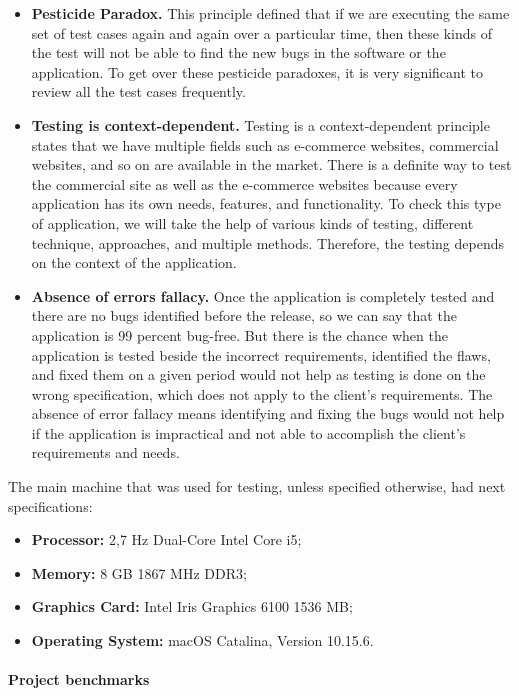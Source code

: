 \documentclass[thesis=M,english,hidelinks]{FITthesis}[2019/12/23]
\begin{document}
\begin{itemize}
	\item \textbf{Pesticide Paradox.} This principle defined that if we are executing the same set of test cases again and again over a particular time, then these kinds of the test will not be able to find the new bugs in the software or the application. To get over these pesticide paradoxes, it is very significant to review all the test cases frequently.
	\item \textbf{Testing is context-dependent.} Testing is a context-dependent principle states that we have multiple fields such as e-commerce websites, commercial websites, and so on are available in the market. There is a definite way to test the commercial site as well as the e-commerce websites because every application has its own needs, features, and functionality. To check this type of application, we will take the help of various kinds of testing, different technique, approaches, and multiple methods. Therefore, the testing depends on the context of the application.
	\item \textbf{Absence of errors fallacy.} Once the application is completely tested and there are no bugs identified before the release, so we can say that the application is 99 percent bug-free. But there is the chance when the application is tested beside the incorrect requirements, identified the flaws, and fixed them on a given period would not help as testing is done on the wrong specification, which does not apply to the client's requirements. The absence of error fallacy means identifying and fixing the bugs would not help if the application is impractical and not able to accomplish the client's requirements and needs.
\end{itemize}


The main machine that was used for testing, unless specified otherwise, had next specifications:
\begin{itemize}
	\item \textbf{Processor:} 2,7 Hz Dual-Core Intel Core i5;
	\item \textbf{Memory:} 8 GB 1867 MHz DDR3;
	\item \textbf{Graphics Card:} Intel Iris Graphics 6100 1536 MB;
	\item \textbf{Operating System:} macOS Catalina, Version 10.15.6.
\end{itemize}

\paragraph{Project benchmarks}
\end{document}
